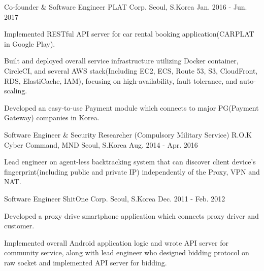 \begin{cventries}
  \cventry
    {Co-founder \& Software Engineer} %
    {PLAT Corp.} %
    {Seoul, S.Korea} %
    {Jan. 2016 - Jun. 2017} %
    {
      \begin{cvitems} %
        \item {Implemented RESTful API server for car rental booking application(CARPLAT in Google Play).}
        \item {Built and deployed overall service infrastructure utilizing Docker container, CircleCI, and several AWS stack(Including EC2, ECS, Route 53, S3, CloudFront, RDS, ElastiCache, IAM), focusing on high-availability, fault tolerance, and auto-scaling.}
        \item {Developed an easy-to-use Payment module which connects to major PG(Payment Gateway) companies in Korea.}
      \end{cvitems}
    }

  \cventry
    {Software Engineer \& Security Researcher (Compulsory Military Service)} %
    {R.O.K Cyber Command, MND} %
    {Seoul, S.Korea} %
    {Aug. 2014 - Apr. 2016} %
    {
      \begin{cvitems} %
        \item {Lead engineer on agent-less backtracking system that can discover client device's fingerprint(including public and private IP) independently of the Proxy, VPN and NAT.}
      \end{cvitems}
    }

  \cventry
    {Software Engineer} %
    {ShitOne Corp.} %
    {Seoul, S.Korea} %
    {Dec. 2011 - Feb. 2012} %
    {
      \begin{cvitems} %
        \item {Developed a proxy drive smartphone application which connects proxy driver and customer.}
        \item {Implemented overall Android application logic and wrote API server for community service, along with lead engineer who designed bidding protocol on raw socket and implemented API server for bidding.}
      \end{cvitems}
    }

\end{cventries}
